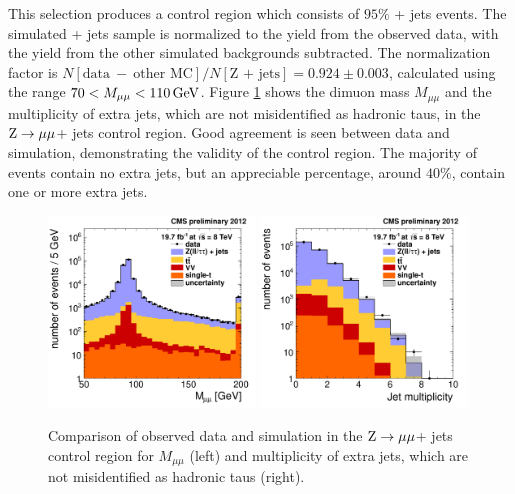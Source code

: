 \documentclass[12pt]{thesis}  %
\newcommand{\ra}{\ensuremath{\rightarrow}}%
\newcommand{\Zmm}{\ensuremath{\Z \ra \mu\mu}\xspace}%
\begin{document}
This selection produces a control region which consists of $95\%$ \Z + jets events. The simulated \Z + jets sample is normalized to the yield from the observed data, with the yield from the other simulated backgrounds subtracted. The normalization factor is $N[\text{data}~-~\text{other MC}]/N[\text{Z + jets}] = 0.924 \pm 0.003$, calculated using the range $70 < M_{\mu\mu} < 110\,\text{Ge\hspace{-.08em}V}$. Figure \ref{Bkg:fig:Zregion} shows the dimuon mass $M_{\mu\mu}$ and the multiplicity of extra jets, which are not misidentified as hadronic taus, in the \Zmm + jets control region. Good agreement is seen between data and simulation, demonstrating the validity of the control region. The majority of events contain no extra jets, but an appreciable percentage, around $40\%$, contain one or more extra jets.

\begin{figure}[hbt]
  \begin{center}
    \includegraphics[width=0.49\textwidth]{figures/bkgEstim/massdimuon.pdf}
    \includegraphics[width=0.49\textwidth]{figures/bkgEstim/njet.pdf}
    \caption{Comparison of observed data and simulation in the \Zmm + jets control region for $M_{\mu\mu}$ (left) and multiplicity of extra jets, which are not misidentified as hadronic taus (right). \label{Bkg:fig:Zregion}}
  \end{center}
\end{figure}
\end{document}

